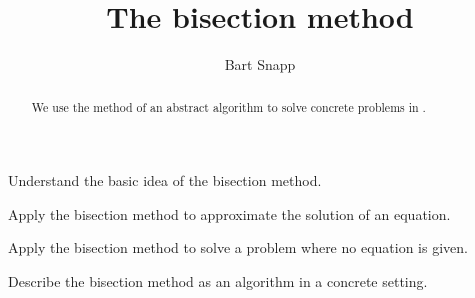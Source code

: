 \documentclass[handout,nooutcomes,noauthor]{ximera}
\title{The bisection method}
\author{Bart Snapp}
\begin{document}
\begin{abstract}
  We use the method of an abstract algorithm to solve concrete
  problems in \snap.
\end{abstract}
\maketitle

\begin{listOutcomes}
\item{Understand the basic idea of the bisection method.}
\item{Apply the bisection method to approximate the solution of an equation.}
\item{Apply the bisection method to solve a problem where no equation is given.}
\item{Describe the bisection method as an algorithm in a concrete setting.}
\end{listOutcomes}
\mynewpage
\end{document}
